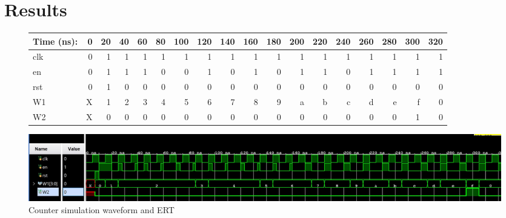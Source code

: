 \documentclass[11pt]{article}
\begin{document}
\clearpage
\section*{Results}

\begin{figure}[ht]\centering
	\begin{tabular}{l|rrrrrrrrrrrrrrrrr}
		Time (ns): & 0 & 20 & 40 & 60 & 80  & 100 & 120 & 140 & 160 & 180 & 200 & 220 & 240 & 260 & 280  & 300 & 320  \\
		\midrule
		clk & 0 & 1 & 1 & 1 & 1 & 1 & 1 & 1 & 1 & 1 & 1 & 1 & 1 & 1 & 1 & 1 & 1 \\
		en & 0 & 1 & 1 & 1 & 0 & 0 & 1 & 0 & 1 & 0 & 1 & 1 & 0 & 1 & 1 & 1 & 1 \\
		rst & 0 & 1 & 0 & 0 & 0 & 0 & 0 & 0 & 0 & 0 & 0 & 0 & 0 & 0 & 0 & 0 & 0 \\
		\midrule
		W1 & X & 1 & 2 & 3 & 4 & 5 & 6 & 7 & 8 & 9 & a & b & c & d & e & f & 0 \\
		W2 & X & 0 & 0 & 0 & 0 & 0 & 0 & 0 & 0 & 0 & 0 & 0 & 0 & 0 & 0 & 1 & 0\\
		\bottomrule
	\end{tabular}\medskip
	
	\includegraphics[width=1.15 \textwidth]{Counter_Test.JPG}
	\caption{Counter simulation waveform and ERT}
	\label{fig:sim_with_table}
\end{figure}
\end{document}
